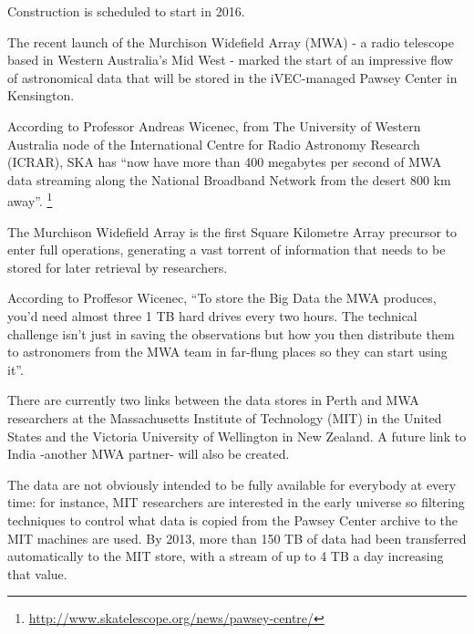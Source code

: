 Construction is scheduled to start in 2016.



The recent launch of the Murchison Widefield Array (MWA) - a radio telescope based in Western Australia's Mid West - marked the start of an impressive flow of astronomical data that will be stored in the iVEC-managed Pawsey Center in Kensington. \newline

According to Professor Andreas Wicenec, from The University of Western Australia node of the International Centre for Radio Astronomy Research (ICRAR), SKA has ``now have more than 400 megabytes per second of MWA data streaming along the National Broadband Network from the desert 800 km away''. \footnote{\url{http://www.skatelescope.org/news/pawsey-centre/}}  \newline

The Murchison Widefield Array is the first Square Kilometre Array precursor to enter full operations, generating a vast torrent of information that needs to be stored for later retrieval by researchers. \newline

According to Proffesor Wicenec, ``To store the Big Data the MWA produces, you’d need almost three 1 TB hard drives every two hours. The technical challenge isn't just in saving the observations but how you then distribute them to astronomers from the MWA team in far-flung places so they can start using it''.

There are currently two links between the data stores in Perth and MWA researchers at the Massachusetts Institute of Technology (MIT) in the United States and the Victoria University of Wellington in New Zealand. A future link to India -another MWA partner- will also be created. \newline

The data are not obviously intended to be fully available for everybody at every time: for instance, MIT researchers are interested in the early universe so filtering techniques to control what data is copied from the Pawsey Center archive to the MIT machines are used. By 2013, more than 150 TB of data had been transferred automatically to the MIT store, with a stream of up to 4 TB a day increasing that value. \newline


